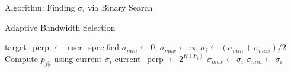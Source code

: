 \documentclass[aspectratio=169]{beamer}
\begin{document}
\begin{frame}{Algorithm: Finding $\sigma_i$ via Binary Search}
\begin{algorithm}[H]
\caption{Adaptive Bandwidth Selection}
\begin{algorithmic}[1]
\STATE target\_perp $\leftarrow$ user\_specified
\STATE $\sigma_{min} \leftarrow 0$, $\sigma_{max} \leftarrow \infty$
\STATE $\sigma_i \leftarrow (\sigma_{min} + \sigma_{max})/2$
  \STATE Compute $p_{j|i}$ using current $\sigma_i$
  \STATE current\_perp $\leftarrow 2^{H(P_i)}$
\STATE $\sigma_{max} \leftarrow \sigma_i$ 
\ELSE
\STATE $\sigma_{min} \leftarrow \sigma_i$ 
\ENDIF
\ENDWHILE
\ENDFOR
\end{algorithmic}
\end{algorithm}
\end{frame}
\end{document}
